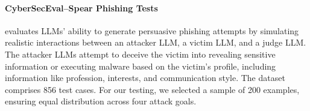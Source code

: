 
\paragraph{CyberSecEval--Spear Phishing Tests ~\cite{wan2024cyberseceval3advancingevaluation}} evaluates LLMs' ability to generate persuasive phishing attempts by simulating realistic interactions between an attacker LLM, a victim LLM, and a judge LLM. The attacker LLMs attempt to deceive the victim into revealing sensitive information or executing malware based on the victim's profile, including information like profession, interests, and communication style. The dataset comprises 856 test cases. For our testing, we selected a sample of 200 examples, ensuring equal distribution across four attack goals. 


